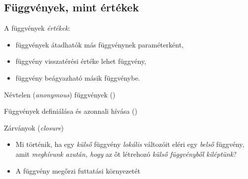 \documentclass[usenames,dvipsnames,aspectratio=169]{beamer}
\begin{document}
\begin{frame}
    \begin{exampleblock}{}
        
    \end{exampleblock}
\end{frame}

\subsection{Függvények, mint értékek}

\begin{frame}
    A függvények \emph{értékek}:
    \begin{itemize}
        \item függvények átadhatók más függvénynek paraméterként,
        \item függvény visszatérési értéke lehet függvény,
        \item függvény beágyazható másik függvénybe.
    \end{itemize}
    \begin{exampleblock}{}
        
    \end{exampleblock}
\end{frame}

\begin{frame}
    \begin{exampleblock}{Névtelen (\emph{anonymous}) függvények ()}
        
    \end{exampleblock}
\end{frame}

\begin{frame}
    \begin{exampleblock}{Függvények definiálása és azonnali hívása ()}
        
    \end{exampleblock}
\end{frame}

\begin{frame}
    Zárványok (\emph{closure})
    \begin{itemize}
        \item<1-> Mi történik, ha egy \emph{külső} függvény \emph{lokális} változóit eléri egy \emph{belső} függvény, amit \emph{meghívunk azután, hogy} az őt létrehozó \emph{külső függvényből kiléptünk}?
        \item<2-> A függvény megőrzi futtatási környezetét
    \end{itemize}
\end{frame}
\end{document}
